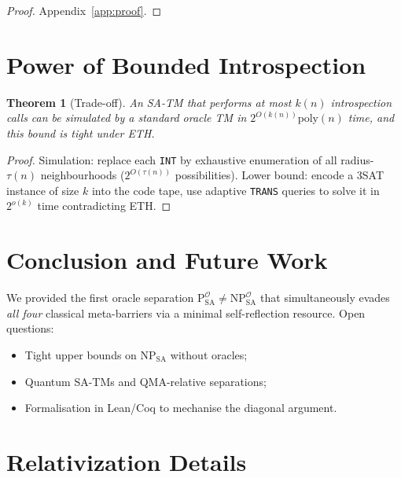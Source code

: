 \documentclass[12pt]{article}
\newcommand{\classP}{\mathrm{P}}
\newcommand{\classNP}{\mathrm{NP}}
\newcommand{\SA}{\mathrm{SA}}
\newcommand{\OO}{\mathcal{O}}
\newcommand{\poly}{\mathrm{poly}}
\theoremstyle{definition}
\theoremstyle{plain}
\newtheorem{theorem}[definition]{Theorem}
\theoremstyle{remark}
\begin{document}
\begin{proof}
Appendix~\ref{app:proof}.
\end{proof}

\section{Power of Bounded Introspection}

\begin{theorem}[Trade-off]\label{thm:tradeoff}
An SA-TM that performs at most \(k(n)\) introspection calls
can be simulated by a standard oracle TM in
\(2^{O(k(n))}\poly(n)\) time, and this bound is tight
under ETH.
\end{theorem}

\begin{proof}
Simulation: replace each \texttt{INT} by exhaustive enumeration of
all radius-\(\tau(n)\) neighbourhoods (\(2^{O(\tau(n))}\) possibilities).
Lower bound: encode a 3SAT instance of size \(k\) into the code tape,
use adaptive \texttt{TRANS} queries to solve it
in \(2^{o(k)}\) time contradicting ETH.
\end{proof}

\section{Conclusion and Future Work}

We provided the first oracle separation
\(\classP^{\OO}_{\SA}\neq\classNP^{\OO}_{\SA}\)
that simultaneously evades \emph{all four} classical meta-barriers via a
minimal self-reflection resource.
Open questions:

\begin{itemize}
  \item Tight upper bounds on \(\classNP_{\SA}\) without oracles;
  \item Quantum SA-TMs and QMA-relative separations;
  \item Formalisation in Lean/Coq to mechanise the diagonal argument.
\end{itemize}

\appendix
\section{Relativization Details}\label{app:relativization}

\end{document}
